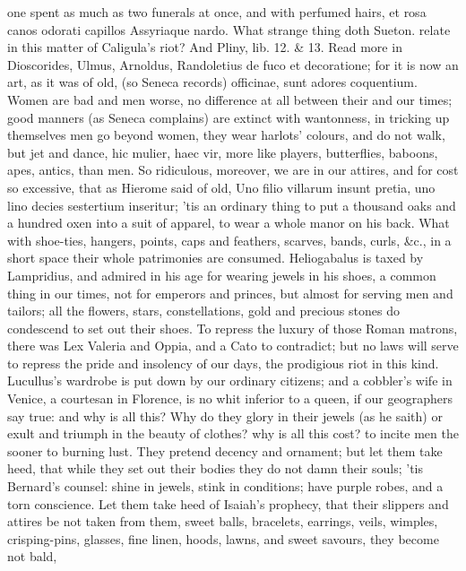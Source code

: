 {one spent as much as two funerals at once, and with perfumed hairs,
et rosa canos odorati capillos Assyriaque nardo. What strange
thing doth Sueton. relate in this matter of Caligula's riot? And
Pliny, lib. 12. \& 13. Read more in Dioscorides, Ulmus, Arnoldus,
Randoletius de fuco et decoratione; for it is now an art, as it was of
old, (so Seneca records) officinae, sunt adores coquentium. Women
are bad and men worse, no difference at all between their and our
times; good manners (as Seneca complains) are extinct with
wantonness, in tricking up themselves men go beyond women, they wear
harlots' colours, and do not walk, but jet and dance, hic mulier, haec
vir, more like players, butterflies, baboons, apes, antics, than men.
So ridiculous, moreover, we are in our attires, and for cost so
excessive, that as Hierome said of old, Uno filio villarum insunt
pretia, uno lino decies sestertium inseritur; 'tis an ordinary thing to
put a thousand oaks and a hundred oxen into a suit of apparel, to wear
a whole manor on his back. What with shoe-ties, hangers, points, caps
and feathers, scarves, bands, curls, \&c., in a short space their whole
patrimonies are consumed. Heliogabalus is taxed by Lampridius, and
admired in his age for wearing jewels in his shoes, a common thing in
our times, not for emperors and princes, but almost for serving men and
tailors; all the flowers, stars, constellations, gold and precious
stones do condescend to set out their shoes. To repress the luxury of
those Roman matrons, there was Lex Valeria and Oppia, and a Cato
to contradict; but no laws will serve to repress the pride and
insolency of our days, the prodigious riot in this kind. Lucullus's
wardrobe is put down by our ordinary citizens; and a cobbler's wife in
Venice, a courtesan in Florence, is no whit inferior to a queen, if our
geographers say true: and why is all this? Why do they glory in their
jewels (as he saith) or exult and triumph in the beauty of
clothes? why is all this cost? to incite men the sooner to burning
lust. They pretend decency and ornament; but let them take heed, that
while they set out their bodies they do not damn their souls; 'tis
Bernard's counsel: shine in jewels, stink in conditions; have
purple robes, and a torn conscience. Let them take heed of Isaiah's
prophecy, that their slippers and attires be not taken from them, sweet
balls, bracelets, earrings, veils, wimples, crisping-pins, glasses,
fine linen, hoods, lawns, and sweet savours, they become not bald,
}

